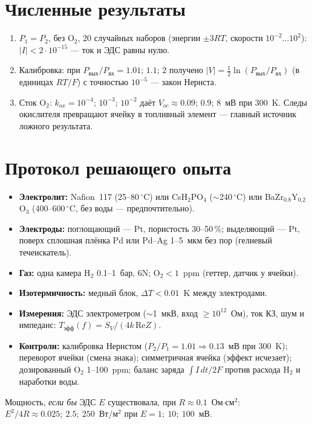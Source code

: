 \documentclass[11pt,a4paper]{article}
\begin{document}
\section{Численные результаты}
\begin{enumerate}
\item $P_1=P_2$, без O$_2$, 20 случайных наборов (энергии $\pm3RT$, скорости $10^{-2}\ldots10^{2}$):
$|I|<2\cdot10^{-15}$ --- ток и ЭДС равны нулю.
\item Калибровка: при $P_{\text{вых}}/P_{\text{вх}}=1.01;\,1.1;\,2$ получено $|V|=\tfrac12\ln(P_{\text{вых}}/P_{\text{вх}})$
(в единицах $RT/F$) с точностью $10^{-5}$ --- закон Нернста.
\item Сток O$_2$: $k_{ox}=10^{-4};\,10^{-3};\,10^{-2}$ даёт $V_{oc}\approx0.09;\,0.9;\,8$~мВ при 300~K.
Следы окислителя превращают ячейку в топливный элемент --- главный источник ложного результата.
\end{enumerate}

\section{Протокол решающего опыта}
\begin{itemize}
\item \textbf{Электролит:} Nafion~117 (25--80\,$^\circ$C) или CsH$_2$PO$_4$ ($\sim$240\,$^\circ$C) или
BaZr$_{0.8}$Y$_{0.2}$O$_3$ (400--600\,$^\circ$C, без воды --- предпочтительно).
\item \textbf{Электроды:} поглощающий --- Pt, пористость 30--50\,\%; выделяющий --- Pt, поверх сплошная
плёнка Pd или Pd--Ag 1--5~мкм без пор (гелиевый течеискатель).
\item \textbf{Газ:} одна камера H$_2$ 0.1--1~бар, 6N; O$_2<1$~ppm (геттер, датчик у ячейки).
\item \textbf{Изотермичность:} медный блок, $\Delta T<0.01$~K между электродами.
\item \textbf{Измерения:} ЭДС электрометром ($\sim$1~мкВ, вход $\ge10^{12}$~Ом), ток КЗ, шум и импеданс:
$T_{\text{эфф}}(f)=S_V/(4k\,\mathrm{Re}Z)$.
\item \textbf{Контроли:} калибровка Нернстом ($P_2/P_1=1.01\Rightarrow0.13$~мВ при 300~K);
переворот ячейки (смена знака); симметричная ячейка (эффект исчезает); дозированный O$_2$ 1--100~ppm;
баланс заряда $\int I\,dt/2F$ против расхода H$_2$ и наработки воды.
\end{itemize}
Мощность, \emph{если бы} ЭДС $E$ существовала, при $R\approx0.1$~Ом$\cdot$см$^2$:
$E^2/4R\approx0.025;\ 2.5;\ 250$~Вт/м$^2$ при $E=1;\ 10;\ 100$~мВ.
\end{document}
